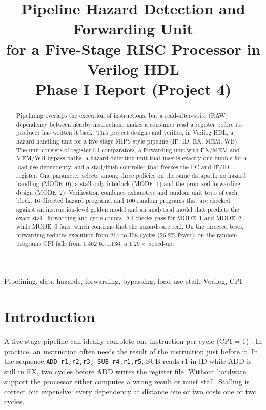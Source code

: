 \documentclass[conference]{IEEEtran}
\begin{document}
\title{Pipeline Hazard Detection and Forwarding Unit\\for a Five-Stage RISC Processor in Verilog HDL\\{\large Phase I Report (Project 4)}}

\author{
}

\maketitle

\begin{abstract}
Pipelining overlaps the execution of instructions, but a read-after-write (RAW) dependency between nearby instructions makes a consumer read a register before its producer has written it back. This project designs and verifies, in Verilog HDL, a hazard-handling unit for a five-stage MIPS-style pipeline (IF, ID, EX, MEM, WB). The unit consists of register-ID comparators, a forwarding unit with EX/MEM and MEM/WB bypass paths, a hazard detection unit that inserts exactly one bubble for a load-use dependency, and a stall/flush controller that freezes the PC and IF/ID register. One parameter selects among three policies on the same datapath: no hazard handling (MODE~0), a stall-only interlock (MODE~1) and the proposed forwarding design (MODE~2). Verification combines exhaustive and random unit tests of each block, 16 directed hazard programs, and 100 random programs that are checked against an instruction-level golden model and an analytical model that predicts the exact stall, forwarding and cycle counts. All checks pass for MODE~1 and MODE~2, while MODE~0 fails, which confirms that the hazards are real. On the directed tests, forwarding reduces execution from 214 to 158 cycles (26.2\% fewer); on the random programs CPI falls from 1.462 to 1.136, a $1.29\times$ speed-up.
\end{abstract}

\begin{IEEEkeywords}
Pipelining, data hazards, forwarding, bypassing, load-use stall, Verilog, CPI.
\end{IEEEkeywords}

\section{Introduction}
A five-stage pipeline can ideally complete one instruction per cycle (CPI = 1) \cite{patterson2013,hennessy2017}. In practice, an instruction often needs the result of the instruction just before it. In the sequence \texttt{ADD r1,r2,r3; SUB r4,r1,r5}, SUB reads r1 in ID while ADD is still in EX, two cycles before ADD writes the register file. Without hardware support the processor either computes a wrong result or must stall. Stalling is correct but expensive: every dependency at distance one or two costs one or two cycles.
\end{document}
